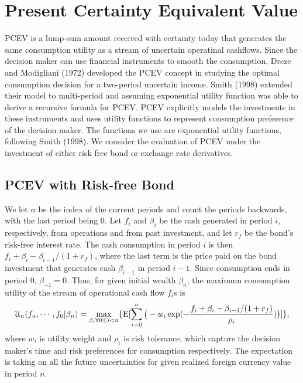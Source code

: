 \documentclass[mnsc,nonblindrev,copyedit]{informs2_wz} %
\newcommand{\E}{\mathrm{E}}
\begin{document}
\section{Present Certainty Equivalent Value}

PCEV is a lump-sum amount received with certainty today that generates the same consumption utility as a stream of uncertain operatinal cashflows. Since the decision maker can use financial instruments to smooth the consumption, Dreze and Modigliani (1972) developed the PCEV concept in studying the optimal consumption decision for a two-period uncertain income. Smith (1998) extended their model to multi-period and assuming exponential utility function was able to derive a recursive formula for PCEV. PCEV explicitly models the investments in these instruments and uses utility functions to represent consumption preference of the decision maker. The functions we use are exponential utility functions, following Smith (1998). We consider the evaluation of PCEV under the investment of either risk free bond or exchange rate derivatives.


\subsection{PCEV with Risk-free Bond}

We let $n$ be the index of the current periods and count the periods backwards, with the last period being 0. Let $f_i$ and $\beta_i$ be the cash generated in period $i$, respectively, from operations and from past investment, and let $r_f$ be the bond's risk-free interest rate. The cash consumption in period $i$ is then  $f_i + \beta_{i} -\beta_{i-1}/(1+r_f)$, where the last term is the price paid on the bond investment that generates cash $\beta_{i-1}$ in period $i-1$. Since consumption ends in period $0$, $\beta_{-1} =0$. Thus, for given initial wealth $\beta_{n}$,  the maximum consumption utility of the stream of operational cash flow $f_i$s is
\begin{eqnarray} 
     \label{eqn:bondInv-rho}
\mathcal{U}_n(f_n, \cdots, f_0|\beta_{n}) = \max_{\beta_{i} \forall 0 \leq i < n} \{\E [ \sum_{i=0}^n \big{(}-w_i \exp (-\frac{f_i + \beta_{i} -\beta_{i-1}/(1+r_f)}{\rho_i})\big{)}]\},
\end{eqnarray}
where $w_i$ is utility weight and $\rho_i$ is risk tolerance, which capture the decision maker's time and risk preferences for consumption respectively.  The expectation is taking on all the future uncertainties for given realized foreign currency value in period $n$.
\end{document}
